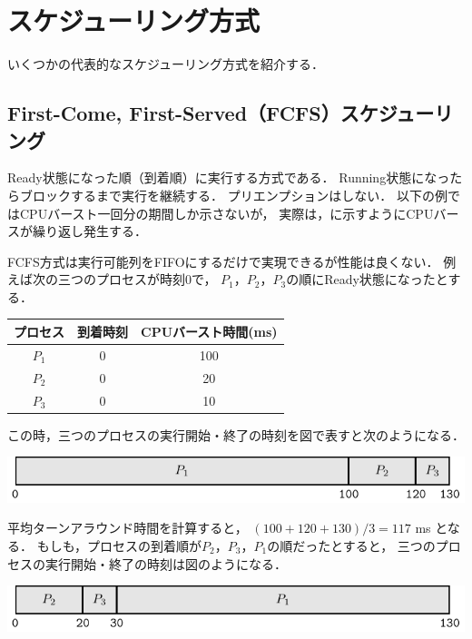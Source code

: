\section{スケジューリング方式}
いくつかの代表的なスケジューリング方式を紹介する．

\subsection{First-Come, First-Served（FCFS）スケジューリング}
Ready状態になった順（到着順）に実行する方式である．
Running状態になったらブロックするまで実行を継続する．
プリエンプションはしない．
以下の例ではCPUバースト一回分の期間しか示さないが，
実際は，に示すようにCPUバースが繰り返し発生する．

FCFS方式は実行可能列をFIFOにするだけで実現できるが性能は良くない．
例えば次の三つのプロセスが時刻0で，
$P_1$，$P_2$，$P_3$の順にReady状態になったとする．

\begin{center}
\begin{tabular}{c c c}
プロセス & 到着時刻 & CPUバースト時間(ms) \\
\hline
$P_1$    & 0 & 100 \\
$P_2$    & 0 & 20 \\
$P_3$    & 0 & 10 \\
\end{tabular}
\end{center}

この時，三つのプロセスの実行開始・終了の時刻を図で表すと次のようになる．

\begin{center}
\includegraphics[scale=1.0]{Tbl/fcfs1.pdf}
\end{center}

平均ターンアラウンド時間を計算すると，
$(100+120+130) / 3 = 117$ ms となる．
もしも，プロセスの到着順が$P_2$，$P_3$，$P_1$の順だったとすると，
三つのプロセスの実行開始・終了の時刻は図のようになる．

\begin{center}
\includegraphics[scale=1.0]{Tbl/fcfs2.pdf}
\end{center}

